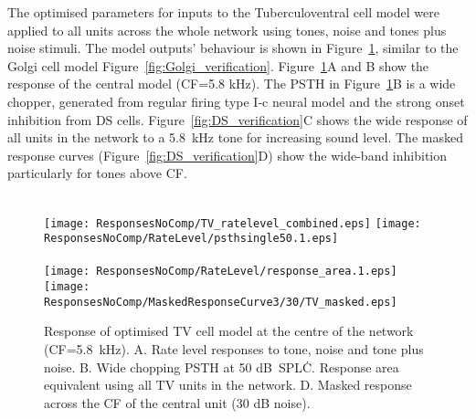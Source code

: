 The optimised parameters for inputs to the Tuberculoventral cell model were applied to all \TV units across the whole network using tones, noise and tones plus noise stimuli. 
The \TV model outputs' behaviour is shown in Figure~\ref{fig:TV_verification}, similar to the Golgi cell model Figure~\ref{fig:Golgi_verification}. 
Figure~\ref{fig:TV_verification}A and B show the response of the central \TV model (CF=5.8 kHz). The PSTH in Figure~\ref{fig:TV_verification}B is a wide chopper, generated from regular firing type I-c neural model and the strong onset inhibition from DS cells.
Figure~\ref{fig:DS_verification}C shows the wide response of all \TV units in the network to a 5.8~kHz tone for increasing sound level. 
The masked response curves (Figure~\ref{fig:DS_verification}D) show the wide-band inhibition particularly for tones above CF. 

\begin{figure}[htb]
{\hspace{0.5\textwidth}\hfill}\\
\texttt{[image: ResponsesNoComp/TV\_ratelevel\_combined.eps]}%
\texttt{[image: ResponsesNoComp/RateLevel/psthsingle50.1.eps]}\\
{\hspace{0.5\textwidth}\hfill}\\
\texttt{[image: ResponsesNoComp/RateLevel/response\_area.1.eps]}%
\texttt{[image: ResponsesNoComp/MaskedResponseCurve3/30/TV\_masked.eps]}\\
\caption[Optimised TV cell model responses]{Response of optimised TV cell model at the centre of the network (CF=5.8~kHz). A. Rate level responses to tone, noise and tone plus noise. 
B. Wide chopping PSTH at 50 dB~SPL\.  
C. Response area equivalent using all TV units in the network. 
D. Masked response across the CF of the central unit (30 dB noise).} \label{fig:TV_verification}
\end{figure}



